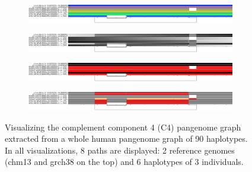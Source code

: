 \begin{figure}[h!]
    \begin{subfigure}{\linewidth}
        \caption{}
        \centering
        \includegraphics[width=1.0\linewidth, trim=0 +2cm 0 0.5cm]{fig/visualization_1D/chr6.pan.fa.a2fb268.4030258.d9f1245.smooth.gfa.C4.sorted}
        \label{fig:odgi_viz_default}
    \end{subfigure}
    \begin{subfigure}{\linewidth}
        \caption{}
        \centering
        \includegraphics[width=1.0\linewidth, trim=0 +2cm 0 0.5cm]{fig/visualization_1D/chr6.pan.fa.a2fb268.4030258.d9f1245.smooth.gfa.C4.sorted.du}
        \label{fig:odgi_viz_color_by_path_pos}
    \end{subfigure}
    \begin{subfigure}{\linewidth}
        \caption{}
        \centering
        \includegraphics[width=\linewidth, trim=0 +2cm 0 0.5cm]{fig/visualization_1D/chr6.pan.fa.a2fb268.4030258.d9f1245.smooth.gfa.C4.sorted.z}
        \label{fig:odgi_viz_color_by_inversion_rate}
    \end{subfigure}
    \begin{subfigure}{1\linewidth}
        \caption{}
        \centering
        \includegraphics[width=\linewidth, trim=0 1.5cm 0 0.5cm]{fig/visualization_1D/chr6.pan.fa.a2fb268.4030258.d9f1245.smooth.gfa.C4.sorted.m}
        \label{fig:odgi_viz_color_by_path_depth}
    \end{subfigure}
    \caption{
        Visualizing the complement component 4 (C4) pangenome graph extracted from a whole human pangenome graph of 90 haplotypes.
        In all visualizations, 8 paths are displayed: 2 reference genomes (chm13 and grch38 on the top) and 6 haplotypes of 3 individuals.
}
\end{figure}
